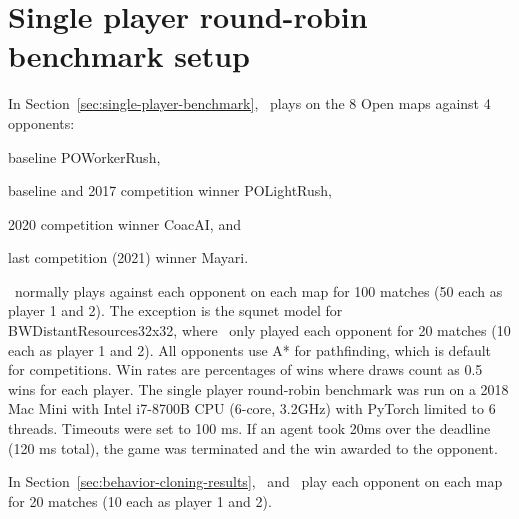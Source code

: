 \documentclass[conference]{IEEEtran}
\newcommand{\mapname}[1]{#1} %
\begin{document}
\section{Single player round-robin benchmark setup}
\label{appendix:single-player-benchmark-setup}
In Section~\ref{sec:single-player-benchmark}, \agentName\ plays on the 8 Open maps
against 4 opponents:
\begin{inparaenum}[(1)]
    \item baseline POWorkerRush,
    \item baseline and 2017 competition winner POLightRush,
    \item 2020 competition winner CoacAI, and
    \item last competition (2021) winner Mayari.
\end{inparaenum}
\agentName\ normally plays against each opponent on each map for 100 matches (50
each as player 1 and 2). The exception is the squnet model for \mapname{BWDistantResources32x32},
where \agentName\ only played each opponent for 20 matches (10 each as player 1 and 2).
All opponents use A* for pathfinding, which is default for competitions.  Win rates are 
percentages of wins where draws count as 0.5 wins for each player. The single player 
round-robin benchmark was run on a 2018 Mac Mini with Intel i7-8700B CPU (6-core, 
3.2GHz) with PyTorch limited to 6 threads. Timeouts were set to 100 ms. If
an agent took 20ms over the deadline (120 ms total), the game was terminated and the win
awarded to the opponent.

In Section~\ref{sec:behavior-cloning-results}, \bcAgent\ and \bcPPOAgent\ play each
opponent on each map for 20 matches
(10 each as player 1 and 2).
\end{document}
